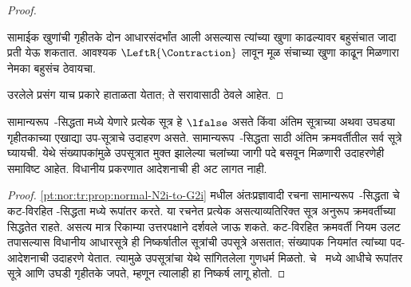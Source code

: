 \begin{proof}
\begin{enumerate}
सामाईक खुणांची गृहीतके दोन आधारसंदर्भांत आली असल्यास
त्यांच्या खुणा काढल्यावर बहुसंचात जादा प्रती येऊ शकतात.
आवश्यक $\LeftR{\Contraction}$ लावून मूळ संचाच्या
खुणा काढून मिळणारा नेमका बहुसंच ठेवायचा.
\end{enumerate}
उरलेले प्रसंग याच प्रकारे हाताळता येतात;
ते सरावासाठी ठेवले आहेत.
\end{proof}

\begin{cor}
सामान्यरूप~-सिद्धता मध्ये येणारे प्रत्येक
सूत्र हे $\lfalse$ असते किंवा अंतिम सूत्राच्या
अथवा उघड्या गृहीतकाच्या एखाद्या उप-सूत्राचे
उदाहरण असते. सामान्यरूप~-सिद्धता साठी
अंतिम क्रमवर्तीतील सर्व सूत्रे घ्यायची.
येथे संख्यापकांमुळे उपसूत्रात मुक्त झालेल्या चलांच्या
जागी पदे बसवून मिळणारी उदाहरणेही समाविष्ट आहेत.
विधानीय प्रकरणात आदेशनाची ही अट लागत नाही.
\end{cor}

\begin{proof}
  \ref{pt:nor:tr:prop:normal-N2i-to-G2i} मधील अंतःप्रज्ञावादी
  रचना सामान्यरूप~-सिद्धता चे कट-विरहित
  -सिद्धता मध्ये रूपांतर करते.
  या रचनेत प्रत्येक असत्याव्यतिरिक्त सूत्र अनुरूप
  क्रमवर्तीच्या सिद्धतेत राहते. असत्य मात्र रिकाम्या
  उत्तरपक्षाने दर्शवले जाऊ शकते.
  कट-विरहित क्रमवर्ती नियम उलट तपासल्यास विधानीय
  आधारसूत्रे ही निष्कर्षातील सूत्रांची उपसूत्रे असतात;
  संख्यापक नियमांत त्यांच्या पद-आदेशनाची उदाहरणे येतात.
  त्यामुळे उपसूत्रांचा येथे सांगितलेला गुणधर्म मिळतो.
   चे~ मध्ये आधीचे रूपांतर सूत्रे
  आणि उघडी गृहीतके जपते, म्हणून त्यालाही हा निष्कर्ष लागू होतो.
\end{proof}



